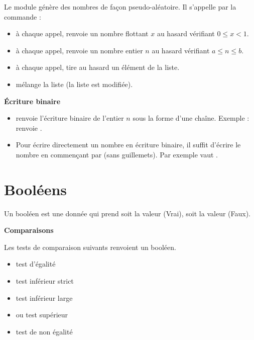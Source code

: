 \documentclass[11pt,class=report,crop=false]{standalone}
\begin{document}
Le module  génère des nombres de façon pseudo-aléatoire. Il s'appelle par la commande :

\begin{itemize}
  \item {}\quad à chaque appel, renvoie un nombre flottant $x$ au hasard vérifiant  $0 \le x < 1$.
  \item {} \quad à chaque appel, renvoie un nombre entier $n$ au hasard vérifiant $a \le n \le b$.
  \item  {} \quad à chaque appel, tire au hasard un élément de la liste.
  \item {} \quad mélange la liste (la liste est modifiée).
 \end{itemize}

\bigskip

\textbf{\'Ecriture binaire}

\begin{itemize}
  \item {}\quad renvoie l'écriture binaire de l'entier $n$ sous la forme d'une chaîne. 
  Exemple :  renvoie .
  
  \item Pour écrire directement un nombre en écriture binaire, il suffit d'écrire le nombre en commençant par  (sans guillemets). Par exemple  vaut .
 \end{itemize}




\section{Booléens}

Un booléen est une donnée qui prend soit la valeur  (\og{}Vrai\fg{}), soit la valeur  (\og{}Faux\fg{}).

  
\bigskip

\textbf{Comparaisons}
 
Les tests de comparaison suivants renvoient un booléen.
  \begin{itemize}
    \item {} \quad test d'égalité
    	\item {} \quad test inférieur strict
    	\item {} \quad test inférieur large
    	\item {} \quad ou \quad {}\quad test supérieur
    	\item {} \quad test de non égalité
  \end{itemize}
  
\end{document}
